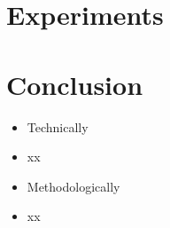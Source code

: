 \section{Experiments}

\section{Conclusion}
\begin{frame}
\begin{itemize}
    \item {Technically}
    \item xx
\end{itemize}
\begin{itemize}
    \item {Methodologically}
    \item xx
\end{itemize}
\end{frame}
